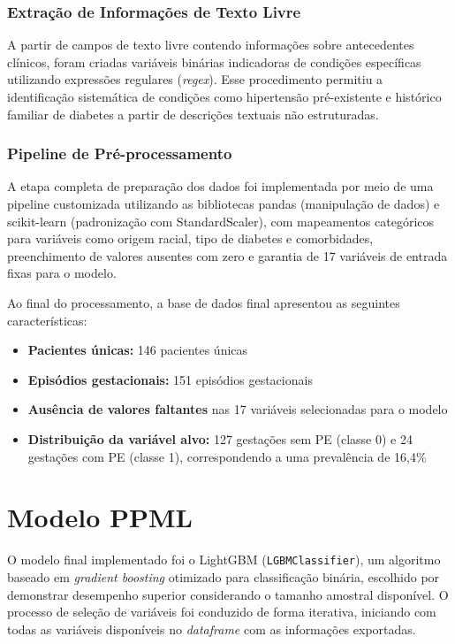 \documentclass[12pt, a4paper]{report}
\theoremstyle{definition}
\theoremstyle{remark}
\theoremstyle{plain}
\begin{document}
\subsubsection{Extração de Informações de Texto Livre}

A partir de campos de texto livre contendo informações sobre antecedentes clínicos, foram criadas variáveis binárias indicadoras de condições específicas utilizando expressões regulares (\textit{regex}). Esse procedimento permitiu a identificação sistemática de condições como hipertensão pré-existente e histórico familiar de diabetes a partir de descrições textuais não estruturadas.

\subsubsection{Pipeline de Pré-processamento}

A etapa completa de preparação dos dados foi implementada por meio de uma pipeline customizada utilizando as bibliotecas pandas (manipulação de dados) e scikit-learn (padronização com StandardScaler), com mapeamentos categóricos para variáveis como origem racial, tipo de diabetes e comorbidades, preenchimento de valores ausentes com zero e garantia de 17 variáveis de entrada fixas para o modelo.

Ao final do processamento, a base de dados final apresentou as seguintes características:
\begin{itemize}
    \item \textbf{Pacientes únicas:} 146 pacientes únicas
    \item \textbf{Episódios gestacionais:} 151 episódios gestacionais
    \item \textbf{Ausência de valores faltantes} nas 17 variáveis selecionadas para o modelo
    \item \textbf{Distribuição da variável alvo:} 127 gestações sem PE (classe 0) e 24 gestações com PE (classe 1), correspondendo a uma prevalência de 16,4\%
\end{itemize}

\section{Modelo PPML}

O modelo final implementado foi o LightGBM (\texttt{LGBMClassifier}), um algoritmo baseado em \textit{gradient boosting} otimizado para classificação binária, escolhido por demonstrar desempenho superior considerando o tamanho amostral disponível. O processo de seleção de variáveis foi conduzido de forma iterativa, iniciando com todas as variáveis disponíveis no \textit{dataframe} com as informações exportadas.
\end{document}
